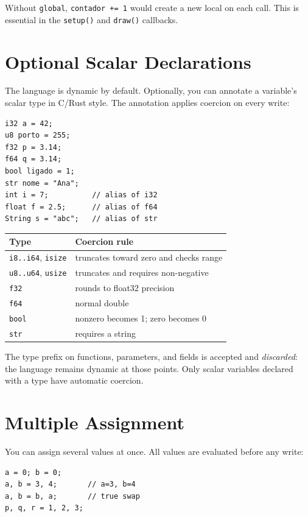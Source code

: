 \documentclass[11pt,a4paper,oneside]{report}
\newcommand{\code}[1]{\texttt{#1}}
\begin{document}
Without \code{global}, \code{contador += 1} would create a new local on
each call. This is essential in the \code{setup()} and \code{draw()}
callbacks.

\section{Optional Scalar Declarations}
The language is dynamic by default. Optionally, you can annotate a
variable's scalar type in C/Rust style. The annotation applies coercion on
every write:

\begin{lstlisting}
i32 a = 42;
u8 porto = 255;
f32 p = 3.14;
f64 q = 3.14;
bool ligado = 1;
str nome = "Ana";
int i = 7;          // alias of i32
float f = 2.5;      // alias of f64
String s = "abc";   // alias of str
\end{lstlisting}

\begin{center}
\begin{tabular}{L{4.5cm}L{9.5cm}}
\toprule
Type & Coercion rule \\
\midrule
\code{i8..i64}, \code{isize} & truncates toward zero and checks range \\
\code{u8..u64}, \code{usize} & truncates and requires non-negative \\
\code{f32} & rounds to float32 precision \\
\code{f64} & normal double \\
\code{bool} & nonzero becomes 1; zero becomes 0 \\
\code{str} & requires a string \\
\bottomrule
\end{tabular}
\end{center}

The type prefix on functions, parameters, and fields is accepted and
\emph{discarded}: the language remains dynamic at those points. Only
scalar variables declared with a type have automatic coercion.

\section{Multiple Assignment}
You can assign several values at once. All values are evaluated before any
write:

\begin{lstlisting}
a = 0; b = 0;
a, b = 3, 4;       // a=3, b=4
a, b = b, a;       // true swap
p, q, r = 1, 2, 3;
\end{lstlisting}
\end{document}
